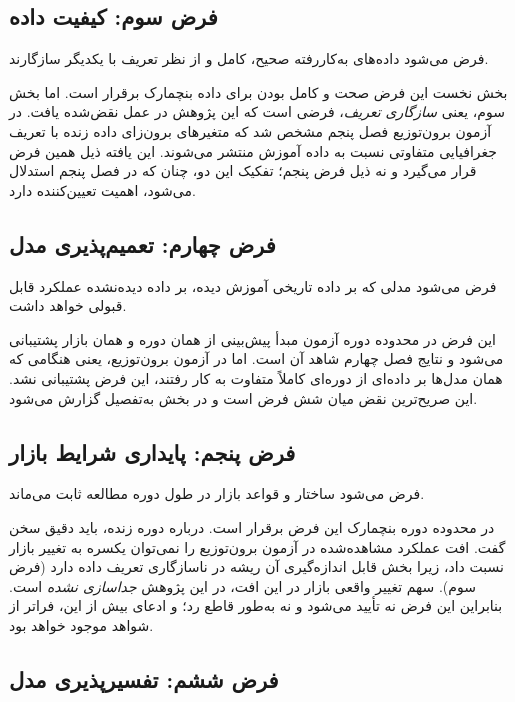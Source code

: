 \subsection*{فرض سوم: کیفیت داده}

فرض می‌شود داده‌های به‌کاررفته صحیح، کامل و از نظر تعریف با یکدیگر سازگارند.

بخش نخست این فرض  صحت و کامل بودن  برای داده بنچمارک برقرار
است. اما بخش سوم، یعنی \emph{سازگاری تعریف}، فرضی است که این پژوهش در
عمل نقض‌شده یافت. در آزمون برون‌توزیع فصل پنجم مشخص شد که متغیرهای
برون‌زای داده زنده با تعریف جغرافیایی متفاوتی نسبت به داده آموزش منتشر
می‌شوند. این یافته ذیل همین فرض قرار می‌گیرد و نه ذیل فرض پنجم؛ تفکیک
این دو، چنان که در فصل پنجم استدلال می‌شود، اهمیت تعیین‌کننده دارد.

\subsection*{فرض چهارم: تعمیم‌پذیری مدل}

فرض می‌شود مدلی که بر داده تاریخی آموزش دیده، بر داده دیده‌نشده عملکرد
قابل قبولی خواهد داشت.

این فرض در محدوده دوره آزمون   مبدأ پیش‌بینی از همان دوره و
همان بازار  پشتیبانی می‌شود و نتایج فصل چهارم شاهد آن است. اما در
آزمون برون‌توزیع، یعنی هنگامی که همان مدل‌ها بر داده‌ای از دوره‌ای کاملاً
متفاوت به کار رفتند، این فرض پشتیبانی نشد. این صریح‌ترین نقض میان شش فرض
است و در بخش  به‌تفصیل گزارش می‌شود.

\subsection*{فرض پنجم: پایداری شرایط بازار}

فرض می‌شود ساختار و قواعد بازار در طول دوره مطالعه ثابت می‌ماند.

در محدوده دوره بنچمارک این فرض برقرار است. درباره دوره زنده، باید دقیق
سخن گفت. افت عملکرد مشاهده‌شده در آزمون برون‌توزیع را نمی‌توان یکسره به
تغییر بازار نسبت داد، زیرا بخش قابل اندازه‌گیری آن ریشه در ناسازگاری
تعریف داده دارد (فرض سوم). سهم تغییر واقعی بازار در این افت، در این پژوهش
\emph{جداسازی نشده} است. بنابراین این فرض نه تأیید می‌شود و نه به‌طور
قاطع رد؛ و ادعای بیش از این، فراتر از شواهد موجود خواهد بود.

\subsection*{فرض ششم: تفسیرپذیری مدل}

